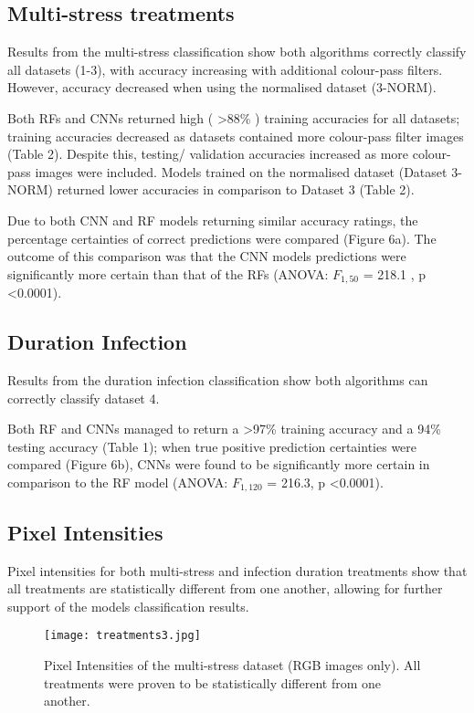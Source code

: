 \documentclass[../../Paper.tex]{subfiles}
\begin{document}
\subsection*{Multi-stress treatments}

Results from the multi-stress classification show both algorithms correctly classify all  datasets (1-3), with accuracy increasing with additional colour-pass filters. However, accuracy decreased when using the normalised dataset (3-NORM).


Both RFs and CNNs returned high ( \textgreater  88\% ) training accuracies for all datasets; training accuracies decreased as datasets contained more colour-pass filter images (Table 2). Despite this, testing/ validation accuracies increased as more colour-pass images were included. Models trained on the normalised dataset (Dataset 3-NORM) returned lower accuracies in comparison to Dataset 3 (Table 2).


Due to both CNN and RF models returning similar accuracy ratings, the percentage certainties of correct predictions were compared (Figure 6a). The outcome of this comparison was that the CNN models predictions were significantly more certain than that of the RFs (ANOVA: $F_{1,50}$ = 218.1 , p \textless 0.0001). 



\subsection*{Duration Infection}

Results from the duration infection classification show both algorithms can correctly classify dataset 4.

Both RF and CNNs managed to return a \textgreater 97\% training accuracy and a 94\% testing accuracy (Table 1); when true positive prediction certainties were compared (Figure 6b), CNNs were found to be significantly more certain in comparison to the RF model (ANOVA: $F_{1,120}$ = 216.3, p \textless 0.0001). 


\subsection*{Pixel Intensities}

Pixel intensities for both multi-stress and infection duration treatments show that all treatments are statistically different from one another, allowing for further support of the models classification results.


\begin{figure}[!b]
  \centering
  \texttt{[image: treatments3.jpg]}
  \caption{Pixel Intensities of the multi-stress dataset (RGB images only). All treatments were proven to be statistically different from one another.}
  \label{fig:sub1}
\end{figure}
\end{document}
